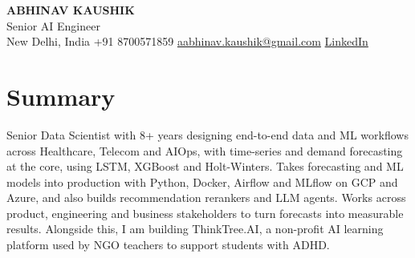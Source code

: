 \documentclass[10pt,a4paper]{article}
\begin{document}
\begin{center}
  {\LARGE\bfseries ABHINAV KAUSHIK}\\[2pt]
  {\large Senior AI Engineer}\\[2pt]
  New Delhi, India \textbar{} +91 8700571859 \textbar{} \href{mailto:aabhinav.kaushik@gmail.com}{aabhinav.kaushik@gmail.com} \textbar{} \href{https://www.linkedin.com/in/abhinav-kaushik10/}{LinkedIn}  
\end{center}

\section{Summary}
Senior Data Scientist with 8+ years designing end-to-end data and ML workflows across Healthcare, Telecom and AIOps, with time-series and demand forecasting at the core, using LSTM, XGBoost and Holt-Winters. Takes forecasting and ML models into production with Python, Docker, Airflow and MLflow on GCP and Azure, and also builds recommendation rerankers and LLM agents. Works across product, engineering and business stakeholders to turn forecasts into measurable results. Alongside this, I am building ThinkTree.AI, a non-profit AI learning platform used by NGO teachers to support students with ADHD.
\end{document}
